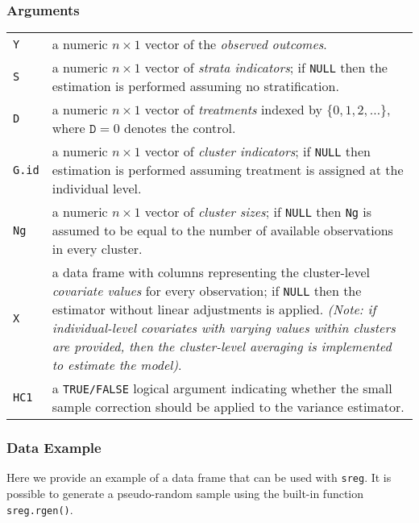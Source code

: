 \documentclass{article}
\makeatletter
\newenvironment{argdesc}{
    \par %
    \noindent %
    \normalfont %
    
    \begin{tabular}{@{}p{0.3\textwidth}p{0.6\textwidth}@{}} %
}{
    \end{tabular}
    \par %
   
}
\makeatother
\begin{document}
\subsubsection*{Arguments}
\begin{argdesc}
    \texttt{Y} & a numeric $n \times 1$ vector of the \textit{observed outcomes}. \\
    \texttt{S} & a numeric $n \times 1$ vector of \textit{strata indicators}; if \texttt{NULL} then the estimation is performed assuming no stratification. \\
    \texttt{D} & a numeric $n \times 1$ vector of \textit{treatments} indexed by $\{0, 1, 2, \ldots\}$, where $\texttt{D} = 0$ denotes the control. \\
    \texttt{G.id} & a numeric $n \times 1$ vector of \textit{cluster indicators}; if \texttt{NULL} then estimation is performed assuming treatment is assigned at the individual level. \\
    \texttt{Ng} & a numeric $n \times 1$ vector of \textit{cluster sizes}; if \texttt{NULL} then \texttt{Ng} is assumed to be equal to the number of available observations in every cluster.\\ %
    \texttt{X} & a data frame with columns representing the cluster-level \textit{covariate values} for every observation; if \texttt{NULL} then the estimator without linear adjustments is applied. \textit{(Note: if individual-level covariates with varying values within clusters are provided, then the cluster-level averaging is implemented to estimate the model)}. \\
    \texttt{HC1} & a \texttt{TRUE/FALSE} logical argument indicating whether the small sample correction should be applied to the variance estimator. \\
\end{argdesc}

\subsubsection*{Data Example}
Here we provide an example of a data frame that can be used with \texttt{sreg}. It is possible to generate a pseudo-random sample using the built-in function \texttt{sreg.rgen()}.
\end{document}
